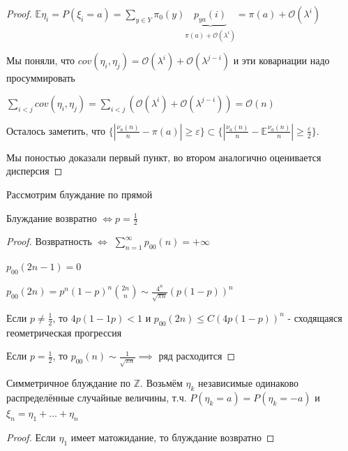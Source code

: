\begin{proof}
    $\mathbb{E} \eta_i = P(\xi_i = a) = \sum\limits_{y \in Y} \pi_0 (y) \underbrace{p_{ya} (i)}_{\pi (a) + \mathcal{O} (\lambda^i)} = \pi (a) + \mathcal{O} (\lambda^i)$ 

    Мы поняли, что $cov (\eta_i, \eta_j) = \mathcal{O} (\lambda^i) + \mathcal{O} (\lambda^{j - i})$ и эти ковариации надо просуммировать

    $\sum\limits_{i < j} cov (\eta_i, \eta_j) = \sum\limits_{i < j} \left(\mathcal{O} (\lambda^i) + \mathcal{O} (\lambda^{j - i})\right) = \mathcal{O} (n)$

    Осталось заметить, что $\{ \left| \frac{\nu_a (n)}{n} - \pi (a) \right| \geqslant \varepsilon \} \subset \{ \left| \frac{\nu_a (n)}{n} - \mathbb{E} \frac{\nu_a (n)}{n} \right| \geqslant \frac{\varepsilon}{2} \}$.

    Мы поностью доказали первый пункт, во втором аналогично оценивается дисперсия
\end{proof}


\begin{theorem}
    Рассмотрим блуждание по прямой

    Блуждание возвратно $\Longleftrightarrow p = \frac{1}{2}$
\end{theorem}

\begin{proof}
    Возвратность $\Longleftrightarrow$ $\sum\limits_{n=1}^\infty p_{00} (n) = +\infty$

    $p_{00} (2n - 1) = 0$

    $p_{00} (2n) = p^n (1-p)^n \binom{2n}{n} \sim \frac{4^n}{\sqrt{\pi n}} (p(1-p))^n $

    Если $p \neq \frac{1}{2}$, то $4p (1 - 1p) < 1$ и $p_{00} (2n) \leqslant C (4p(1-p))^n $ - сходящаяся геометрическая прогрессия

    Если $p = \frac{1}{2}$, то $p_{00} (n) \sim \frac{1}{\sqrt{\pi n}} \implies$ ряд расходится
\end{proof}

\begin{remark}
    
Симметричное блуждание по $\mathbb{Z}$. Возьмём $\eta_k$ независимые одинаково распределённые случайные величины, т.ч. $P(\eta_k = a) = P(\eta_k = -a)$ и $\xi_n = \eta_1 + \ldots + \eta_n$

\end{remark}

\begin{proof}
    Если $\eta_1$ имеет матожидание, то блуждание возвратно
\end{proof}

